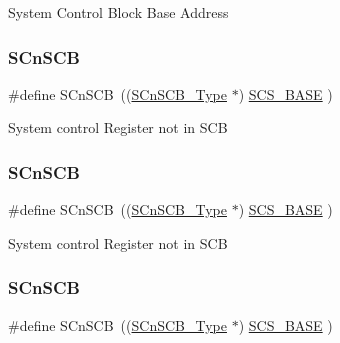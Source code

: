 System Control Block Base Address \mbox{\label{group___c_m_s_i_s__core__base_ga9fe0cd2eef83a8adad94490d9ecca63f}} 
\subsubsection{\texorpdfstring{S\+Cn\+S\+CB}{SCnSCB}\hspace{0.1cm}{\footnotesize\ttfamily [1/5]}}
{\footnotesize\ttfamily \#define S\+Cn\+S\+CB~((\mbox{\hyperlink{struct_s_cn_s_c_b___type}{S\+Cn\+S\+C\+B\+\_\+\+Type}}    $\ast$)     \mbox{\hyperlink{group___c_m_s_i_s__core__base_ga3c14ed93192c8d9143322bbf77ebf770}{S\+C\+S\+\_\+\+B\+A\+SE}}      )}

System control Register not in S\+CB \mbox{\label{group___c_m_s_i_s__core__base_ga9fe0cd2eef83a8adad94490d9ecca63f}} 
\subsubsection{\texorpdfstring{S\+Cn\+S\+CB}{SCnSCB}\hspace{0.1cm}{\footnotesize\ttfamily [2/5]}}
{\footnotesize\ttfamily \#define S\+Cn\+S\+CB~((\mbox{\hyperlink{struct_s_cn_s_c_b___type}{S\+Cn\+S\+C\+B\+\_\+\+Type}}    $\ast$)     \mbox{\hyperlink{group___c_m_s_i_s__core__base_ga3c14ed93192c8d9143322bbf77ebf770}{S\+C\+S\+\_\+\+B\+A\+SE}}      )}

System control Register not in S\+CB \mbox{\label{group___c_m_s_i_s__core__base_ga9fe0cd2eef83a8adad94490d9ecca63f}} 
\subsubsection{\texorpdfstring{S\+Cn\+S\+CB}{SCnSCB}\hspace{0.1cm}{\footnotesize\ttfamily [3/5]}}
{\footnotesize\ttfamily \#define S\+Cn\+S\+CB~((\mbox{\hyperlink{struct_s_cn_s_c_b___type}{S\+Cn\+S\+C\+B\+\_\+\+Type}}    $\ast$)     \mbox{\hyperlink{group___c_m_s_i_s__core__base_ga3c14ed93192c8d9143322bbf77ebf770}{S\+C\+S\+\_\+\+B\+A\+SE}}      )}

